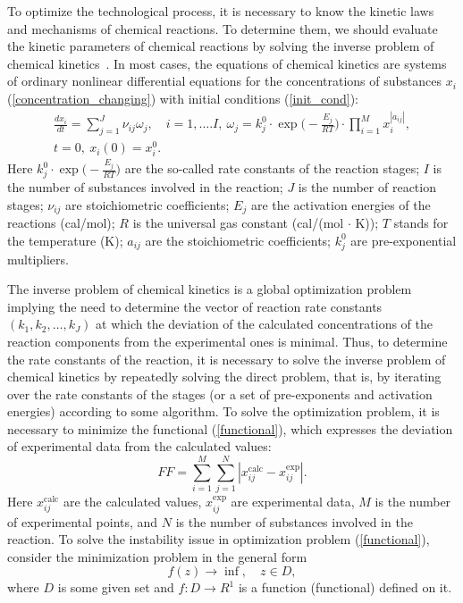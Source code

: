 \documentclass{svproc}
\begin{document}
To optimize the technological process, it is necessary to know the kinetic laws and mechanisms of chemical reactions. To determine them, we should evaluate the kinetic parameters of chemical reactions by solving the inverse problem of chemical kinetics~\cite{regularization}. In most cases, the equations of chemical kinetics are systems of ordinary nonlinear differential equations for the concentrations of substances $x_{i}$ (\ref{concentration_changing}) with initial conditions (\ref{init_cond}):
\begin{gather}
  \frac{dx_{i}}{dt} = \sum_{j=1} ^J \nu_{ij} \omega_j,\quad i=1,\ldots.I,\ \omega_j=k_j^0 \cdot \exp \biggl(-\frac{E_{j}}{RT}\biggr)\cdot \prod_{i=1} ^M x_{i}^{|a_{ij}|},
\label{concentration_changing}\\
t=0,\ x_i(0)=x_i^0.
\label{init_cond}
\end{gather}
Here $k_j^0 \cdot \exp\bigl(-\frac{E_{j}}{RT}\bigr)$ are the so-called rate constants of the reaction stages; $I$ is the number of substances involved in the reaction; $J$ is the number of reaction stages; $\nu_{ij}$ are stoichiometric coefficients; $E_j$ are the activation energies of the reactions (cal/mol); $R$ is the universal gas constant (cal/(mol $\cdot$ K)); $T$ stands for the temperature (K); $a_{ij}$ are the stoichiometric coefficients; $k_j^0$ are pre-exponential multipliers.

The inverse problem of chemical kinetics is a global optimization problem implying the need to determine the vector of reaction rate constants $(k_1, k_2, \ldots, k_J)$ at which the deviation of the calculated concentrations of the reaction components from the experimental ones is minimal.
Thus, to determine the rate constants of the reaction, it is necessary to solve the inverse problem of chemical kinetics by repeatedly solving the direct problem, that is, by iterating over the rate constants of the stages (or a set of pre-exponents and activation energies) according to some algorithm. To solve the optimization problem, it is necessary to minimize the functional (\ref{functional}), which expresses the deviation of experimental data from the calculated values:
\begin{equation}
FF = \sum_{i=1} ^M \sum_{j=1} ^N |x_{ij}^{\mathrm{calc}} - x_{ij}^{\mathrm{exp}}|.
\label{functional}
\end{equation}
Here $x_{ij}^{\mathrm{calc}}$ are the calculated values, $x_{ij}^{\mathrm{exp}}$ are experimental data, $M$ is the number of experimental points, and $N$ is the number of substances involved in the reaction.
To solve the instability issue in optimization problem (\ref{functional}), consider the minimization problem in the general form
\begin{equation}
f(z) \rightarrow \inf,\quad z \in D,
\label{problem}
\end{equation}
where $D$ is some given set and $f\colon D \rightarrow R^1$ is a function (functional) defined on it.
\end{document}
